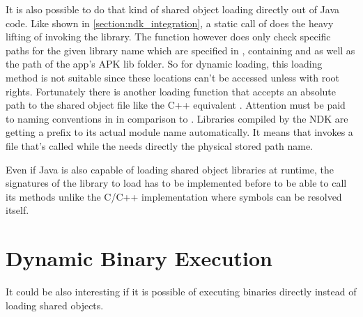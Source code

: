 It is also possible to do that kind of shared object loading directly out of Java
code. Like shown in \autoref{section:ndk_integration}, a static call of 
 does the heavy lifting of invoking the library. 
The  function however does only check specific paths for the given
library name which are specified in , containing 
 and  as well as the path of the app's APK lib
folder. So for dynamic loading, this loading method is not suitable since these
locations can't be accessed unless with root rights. Fortunately there is another
loading function  that accepts an absolute path to 
the shared object file like the C++ equivalent . Attention must be
paid to naming conventions in  in comparison to .
Libraries compiled by the NDK are getting a  prefix to its actual module
name automatically. It means that  invokes a file
that's called  while the  needs directly the physical
stored path name.

Even if Java is also capable of loading shared object libraries at runtime, the 
signatures of the library to load has to be implemented before to be able to call
its methods unlike the C/C++ implementation where symbols can be resolved itself.


\section{Dynamic Binary Execution}\label{section:dyn_bin_exec}

It could be also interesting if it is possible of executing binaries directly
instead of loading shared objects. 